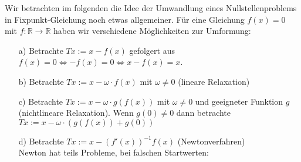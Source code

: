 \documentclass{article}
\begin{document}
Wir betrachten im folgenden die Idee der Umwandlung eines Nullstellenproblems in Fixpunkt-Gleichung noch etwas 
allgemeiner. Für eine Gleichung $f(x)=0$ mit $f:\mathbb{R}\rightarrow\mathbb{R}$ haben wir verschiedene Möglichkeiten 
zur Umformung:\\
\begin{enumerate}
    \item[a)] Betrachte $Tx := x-f(x)$ gefolgert aus $f(x)=0\Leftrightarrow -f(x)=0 \Leftrightarrow x-f(x)=x$.
    \item[b)] Betrachte $Tx := x-\omega \cdot f(x)$ mit $\omega\neq 0$ (lineare Relaxation)
    \item[c)] Betrachte $Tx:=x-\omega \cdot g(f(x))$ mit $\omega \neq 0$ und geeigneter Funktion $g$ 
    (nichtlineare Relaxation). Wenn $g(0)\neq 0$ dann betrachte $Tx:=x-\omega\cdot(g(f(x))+g(0))$
    \newpage
    \item[d)] Betrachte $Tx:=x-(f'(x))^{-1} f(x)$ (Newtonverfahren) \\
    Newton hat teils Probleme, bei falschen Startwerten: \\
    \begin{center}
\end{center}
\end{enumerate}
\end{document}
